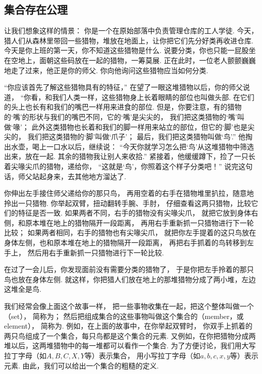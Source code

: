 \subsection{集合存在公理}
让我们想象这样的情景：
你是一个在原始部落中负责管理仓库的工人学徒.
今天，猎人们从森林里带回一些猎物，堆放在地面上，让你把它们先分好类再收进仓库.
今天是你上班的第一天，你不知道这些猎物是什么.
说要分类，你也只能一屁股坐在空地上，面朝这些码放在一起的猎物，一筹莫展.
正在此时，一位老人颤颤巍巍地走了过来，他正是你的师父.
你向他询问这些猎物应当如何分类.

“你应该首先了解这些猎物具有的特征，”
在望了一眼这堆猎物以后，你的师父说道，
“你看，和我们人类一样，这些猎物身上长着眼睛的部位也叫做头部.
在它们的头上也长有和我们的嘴巴一样用来进食的部位.
但是，你要注意，有的猎物的‘嘴’的形状与我们的嘴巴不同，它的‘嘴’是尖尖的，
我们把这类猎物的‘嘴’叫做‘喙’；
此外这类猎物也长着和我们的脚一样用来站立的部位，但它的‘脚’也是尖尖的，
我们把这类猎物的‘脚’叫做‘爪子’；
最后，我们把这类猎物叫做‘鸟’.”
他掏出水壶，喝上一口水以后，继续说：
“今天你就学习怎么把‘鸟’从这堆猎物中筛选出来，放在一起.
其余的猎物我让别人来收拾.”
紧接着，他缓缓蹲下，捡了一只长着尖喙尖爪的猎物，递给你，
“这就是‘鸟’，你照着这个样子分类吧！”
说完这句话，师父站起身来，去其他地方溜达了.

你伸出左手接住师父递给你的那只鸟，
再用空着的右手在猎物堆里扒拉，随意地拎出一只猎物.
你举起双臂，扭动翻转手腕、手肘，
仔细查看这两只猎物，比较它们的特征是否一致.
如果两者不同，右手的猎物没有尖喙尖爪，
就把它放到身体右侧，和原本堆在地上的猎物隔开一段距离，
再用右手重新抓一只猎物进行下一轮比较；
如果两者相同，右手的猎物也有尖喙尖爪，
就把你左手提着的这只鸟放在身体左侧，也和原本堆在地上的猎物隔开一段距离，
再把右手抓着的鸟转移到左手上，
然后用右手重新抓一只猎物进行下一轮比较.

在过了一会儿后，你发现面前没有需要分类的猎物了，
于是你把左手拎着的那只鸟也放在身体左侧.
就这样，你把猎人们放在地上的那堆猎物分成了两小堆，左边这堆全是鸟.


我们经常会像上面这个故事一样，
把一些事物收集在一起，把这个整体叫做一个（set），
简称为；
然后把组成集合的这些事物叫做这个集合的（member，或element），
简称为.
例如，在上面的故事中，在你举起双臂时，
你双手上抓着的两只鸟组成了一个集合，每只鸟都是这个集合的元素.
又例如，在你把猎物分成两堆以后，这两堆猎物中的每一堆都可以看作一个集合.
为了方便讨论，我们用大写拉丁字母（如\(A,B,C,X,Y\)等）表示集合，
用小写拉丁字母（如\(a,b,c,x,y\)等）表示元素.
由此，我们可以给出一个集合的粗糙的定义.

